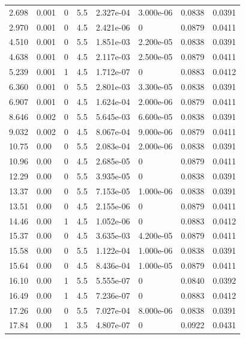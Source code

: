 \documentclass[preview]{standalone}
\begin{document}
{{\begin{tabular}{L{1.2cm}C{1.2cm} C{0.3cm}C{0.5cm} C{1.4cm}C{1.4cm} C{1.4cm}C{1.4cm}}
  2.698  &  0.001  & 0     & 5.5 &  2.327e-04  & 3.000e-06  & 0.0838 &  0.0391   \\ 
  2.970  &  0.001  & 0     & 4.5 &  2.421e-06  & 0  & 0.0879 &  0.0411   \\ 
  4.510  &  0.001  & 0     & 5.5 &  1.851e-03  & 2.200e-05  & 0.0838 &  0.0391   \\ 
  4.638  &  0.001  & 0     & 4.5 &  2.117e-03  & 2.500e-05  & 0.0879 &  0.0411   \\ 
  5.239  &  0.001  & 1     & 4.5 &  1.712e-07  & 0  & 0.0883 &  0.0412   \\ 
  6.360  &  0.001  & 0     & 5.5 &  2.801e-03  & 3.300e-05  & 0.0838 &  0.0391   \\ 
  6.907  &  0.001  & 0     & 4.5 &  1.624e-04  & 2.000e-06  & 0.0879 &  0.0411   \\ 
  8.646  &  0.002  & 0     & 5.5 &  5.645e-03  & 6.600e-05  & 0.0838 &  0.0391   \\ 
  9.032  &  0.002  & 0     & 4.5 &  8.067e-04  & 9.000e-06  & 0.0879 &  0.0411   \\ 
  10.75  &  0.00  & 0     & 5.5 &  2.083e-04  & 2.000e-06  & 0.0838 &  0.0391   \\ 
  10.96  &  0.00  & 0     & 4.5 &  2.685e-05  & 0  & 0.0879 &  0.0411   \\ 
  12.29  &  0.00  & 0     & 5.5 &  3.935e-05  & 0  & 0.0838 &  0.0391   \\ 
  13.37  &  0.00  & 0     & 5.5 &  7.153e-05  & 1.000e-06  & 0.0838 &  0.0391   \\ 
  13.51  &  0.00  & 0     & 4.5 &  2.155e-06  & 0  & 0.0879 &  0.0411   \\ 
  14.46  &  0.00  & 1     & 4.5 &  1.052e-06  & 0  & 0.0883 &  0.0412   \\ 
  15.37  &  0.00  & 0     & 4.5 &  3.635e-03  & 4.200e-05  & 0.0879 &  0.0411   \\ 
  15.58  &  0.00  & 0     & 5.5 &  1.122e-04  & 1.000e-06  & 0.0838 &  0.0391   \\ 
  15.64  &  0.00  & 0     & 4.5 &  8.436e-04  & 1.000e-05  & 0.0879 &  0.0411   \\ 
  16.10  &  0.00  & 1     & 5.5 &  5.555e-07  & 0  & 0.0840 &  0.0392   \\ 
  16.49  &  0.00  & 1     & 4.5 &  7.236e-07  & 0  & 0.0883 &  0.0412   \\ 
  17.26  &  0.00  & 0     & 5.5 &  7.027e-04  & 8.000e-06  & 0.0838 &  0.0391   \\ 
  17.84  &  0.00  & 1     & 3.5 &  4.807e-07  & 0  & 0.0922 &  0.0431   \\ 

\end{tabular}}}
\end{document}
